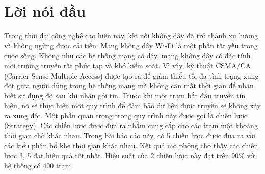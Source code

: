 %

\section*{Lời nói đầu}
\label{sec::abstract}
\parindent=10pt

Trong thời đại công nghệ cao hiện nay, kết nối không dây đã trở thành xu hướng và không ngừng được cải tiến. Mạng không dây Wi-Fi là một phần tất yếu trong cuộc sống. Không như các hệ thống mạng có dây, mạng không dây có đặc tính môi trường truyền rất phức tạp và khó kiểm soát. Vì vậy, kỹ thuật 
CSMA/CA (Carrier Sense Multiple Access) được tạo ra để giảm thiểu tối đa tình trạng xung đột giữa người dùng trong hệ thống mạng mà không cần mất thời gian để nhận biết sự đụng độ sau khi nhận gói tin. Trước khi một trạm bắt đầu truyền tín hiệu, nó sẽ thực hiện một quy trình để đảm bảo dữ liệu được truyền sẽ không xảy ra xung đột.
Một phần quan trọng trong quy trình này được gọi là chiến lược (Strategy). Các chiến lược được đưa ra nhằm cung cấp cho các trạm một khoảng thời gian chờ khác nhau. Trong bài báo cáo này, có 5 chiến lược được đưa ra với các kiểu phân bổ khe thời gian khác nhau.
Kết quả mô phỏng cho thấy các chiến lược 3, 5 đạt hiệu quả tốt nhất. Hiệu suất của 2 chiến lược này đạt trên 90\% với hệ thống có 400 trạm.






